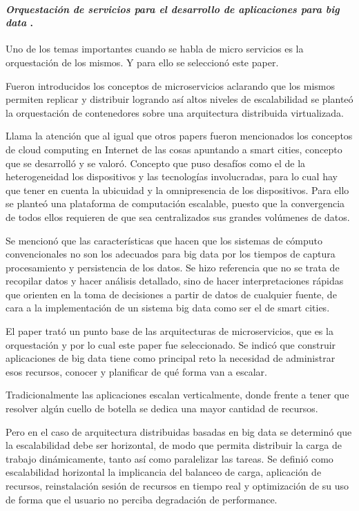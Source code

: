 
\paragraph{
    \textbf{\emph{Orquestación de servicios para el desarrollo de aplicaciones para big data}}
    \cite{orquestacion}.
 }

Uno de los temas importantes cuando se habla de micro servicios es la orquestación de los mismos. Y para ello se seleccionó este paper. 

Fueron introducidos los conceptos de microservicios aclarando que los mismos permiten replicar y distribuir logrando así altos niveles de escalabilidad se planteó la orquestación de contenedores sobre una arquitectura distribuida virtualizada. 

Llama la atención que al igual que otros papers fueron mencionados los conceptos de cloud computing en Internet de las cosas apuntando a smart cities, concepto que se desarrolló y se valoró. Concepto que puso desafíos como el de la heterogeneidad los dispositivos y las tecnologías involucradas, para lo cual hay que tener en cuenta la ubicuidad y la omnipresencia de los dispositivos. 
Para ello se planteó una plataforma de computación escalable, puesto que la convergencia de todos ellos requieren de que sea centralizados sus grandes  volúmenes de datos. 

Se mencionó que las características que hacen que los sistemas de cómputo convencionales no son los adecuados para big data por los tiempos de captura procesamiento y persistencia de los datos. Se hizo referencia que no se trata de recopilar datos y hacer análisis detallado, sino de hacer interpretaciones rápidas que orienten en la toma de decisiones a partir de datos de cualquier fuente, de cara a la implementación de un sistema big data como ser el de smart cities.


El paper trató un punto base de las arquitecturas de microservicios, que es la orquestación y por lo cual este paper fue seleccionado. Se indicó que construir aplicaciones de big data tiene como principal reto la necesidad de administrar esos recursos, conocer y planificar de qué forma van a escalar. 

Tradicionalmente las aplicaciones escalan verticalmente, donde frente a tener que resolver algún cuello de botella se dedica una mayor cantidad de recursos. 

Pero en el caso de arquitectura distribuidas basadas en big data se determinó que la escalabilidad debe ser horizontal, de modo que permita distribuir la carga de trabajo dinámicamente, tanto así como paralelizar las tareas. 
Se definió como escalabilidad horizontal la implicancia del balanceo de carga, aplicación de recursos, reinstalación sesión de recursos en tiempo real y optimización de su uso de forma que el usuario no perciba degradación de performance. 


